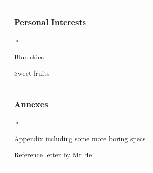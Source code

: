 \documentclass[a4paper]{article}
\newlength{\sectsep}
\newlength{\subsectsep}
\renewenvironment{itemize}{
  \begin{list}{$\diamond$}{
    \setlength{\topsep}{0.1em}
    \setlength{\itemsep}{0em}
    \setlength{\parskip}{0pt}
    \setlength{\parsep}{0em}
  }
}{
  \end{list}
}
\begin{document}
\begin{longtable}{r || l}
  & \begin{minipage}{0.9\textwidth}
      \vspace{\subsectsep}
      \subsubsection*{Personal Interests}
      \begin{itemize}
          \item Blue skies
          \item Sweet fruits
      \end{itemize}
  \end{minipage} \\[\sectsep]

  & \begin{minipage}{0.9\textwidth}
      \vspace{\subsectsep}
      \subsubsection*{Annexes}
      \begin{itemize}
          \item Appendix including some more boring specs
          \item Reference letter by Mr He
      \end{itemize}
      \vfill
    \end{minipage} \\

  \end{longtable}
\end{document}
